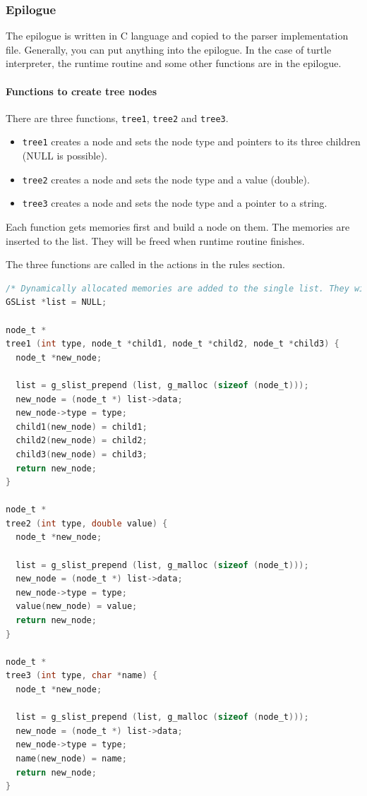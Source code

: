 \subsubsection{Epilogue}\label{epilogue}

The epilogue is written in C language and copied to the parser
implementation file. Generally, you can put anything into the epilogue.
In the case of turtle interpreter, the runtime routine and some other
functions are in the epilogue.

\paragraph{Functions to create tree
nodes}\label{functions-to-create-tree-nodes}

There are three functions, \passthrough{\lstinline!tree1!},
\passthrough{\lstinline!tree2!} and \passthrough{\lstinline!tree3!}.

\begin{itemize}
\tightlist
\item
  \passthrough{\lstinline!tree1!} creates a node and sets the node type
  and pointers to its three children (NULL is possible).
\item
  \passthrough{\lstinline!tree2!} creates a node and sets the node type
  and a value (double).
\item
  \passthrough{\lstinline!tree3!} creates a node and sets the node type
  and a pointer to a string.
\end{itemize}

Each function gets memories first and build a node on them. The memories
are inserted to the list. They will be freed when runtime routine
finishes.

The three functions are called in the actions in the rules section.

\begin{lstlisting}[language=C]
/* Dynamically allocated memories are added to the single list. They will be freed in the finalize function. */
GSList *list = NULL;

node_t *
tree1 (int type, node_t *child1, node_t *child2, node_t *child3) {
  node_t *new_node;

  list = g_slist_prepend (list, g_malloc (sizeof (node_t)));
  new_node = (node_t *) list->data;
  new_node->type = type;
  child1(new_node) = child1;
  child2(new_node) = child2;
  child3(new_node) = child3;
  return new_node;
}

node_t *
tree2 (int type, double value) {
  node_t *new_node;

  list = g_slist_prepend (list, g_malloc (sizeof (node_t)));
  new_node = (node_t *) list->data;
  new_node->type = type;
  value(new_node) = value;
  return new_node;
}

node_t *
tree3 (int type, char *name) {
  node_t *new_node;

  list = g_slist_prepend (list, g_malloc (sizeof (node_t)));
  new_node = (node_t *) list->data;
  new_node->type = type;
  name(new_node) = name;
  return new_node;
}
\end{lstlisting}

